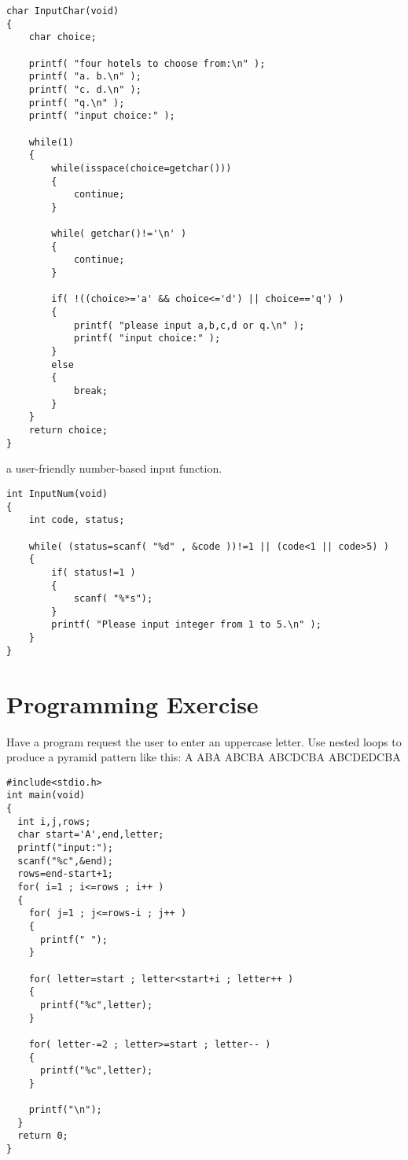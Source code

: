 \begin{solution}
  \begin{verbatim}
char InputChar(void)
{
	char choice;

	printf( "four hotels to choose from:\n" );
	printf( "a.	b.\n" );
	printf( "c.	d.\n" );
	printf( "q.\n" );
	printf( "input choice:" );

	while(1)
	{
		while(isspace(choice=getchar()))
		{
			continue;
		}

		while( getchar()!='\n' )
		{
			continue;
		}

		if( !((choice>='a' && choice<='d') || choice=='q') )
		{
			printf( "please input a,b,c,d or q.\n" );
			printf( "input choice:" );
		}
		else
		{
			break;
		}
	}
	return choice;
}
  \end{verbatim}
\end{solution}
\begin{tip}
  a user-friendly number-based input function.
\end{tip}
\begin{solution}
  \begin{verbatim}
int InputNum(void)
{
	int code, status;
	
	while( (status=scanf( "%d" , &code ))!=1 || (code<1 || code>5) )
	{
		if( status!=1 )
		{
			scanf( "%*s");
		}
		printf( "Please input integer from 1 to 5.\n" );
	}
}
  \end{verbatim}
\end{solution}

\section{Programming Exercise}
\begin{question}
  Have a program request the user to enter an uppercase letter. Use nested loops to produce
  a pyramid pattern like this:
      A
     ABA
    ABCBA
   ABCDCBA
  ABCDEDCBA
\end{question}
\begin{solution}
  \begin{verbatim}
#include<stdio.h>
int main(void)
{
  int i,j,rows;
  char start='A',end,letter;
  printf("input:");
  scanf("%c",&end);
  rows=end-start+1;
  for( i=1 ; i<=rows ; i++ )
  {
    for( j=1 ; j<=rows-i ; j++ )
    {
      printf(" ");
    }

    for( letter=start ; letter<start+i ; letter++ )
    {
      printf("%c",letter);
    }

    for( letter-=2 ; letter>=start ; letter-- )
    {
      printf("%c",letter);
    }

    printf("\n");
  }
  return 0;
}
  \end{verbatim}
\end{solution}

